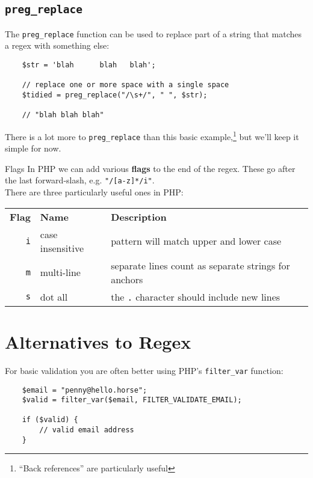 \subsection{\texttt{preg\_replace}}

The \texttt{preg\_replace} function can be used to replace part of a string that matches a regex with something else:

\begin{verbatim}
    $str = 'blah      blah   blah';

    // replace one or more space with a single space
    $tidied = preg_replace("/\s+/", " ", $str);

    // "blah blah blah"
\end{verbatim}


There is a lot more to \texttt{preg\_replace} than this basic example,\footnote{``Back references'' are particularly useful} but we'll keep it simple for now.

\begin{infobox}{Flags}
    In PHP we can add various \textbf{flags} to the end of the regex. These go after the last forward-slash, e.g. \texttt{"/[a-z]*/i"}.
    \\

    There are three particularly useful ones in PHP:

    \begin{tabu}{r l X}
        \textbf{Flag}    & \textbf{Name}    & \textbf{Description} \\
        \texttt{i}       & case insensitive & pattern will match upper and lower case \\
        \texttt{m}       & multi-line       & separate lines count as separate strings for anchors\\
        \texttt{s}       & dot all          & the \texttt{.} character should include new lines\\
    \end{tabu}
\end{infobox}


\section{Alternatives to Regex}

For basic validation you are often better using PHP's \texttt{filter\_var} function:

\begin{verbatim}
    $email = "penny@hello.horse";
    $valid = filter_var($email, FILTER_VALIDATE_EMAIL);

    if ($valid) {
        // valid email address
    }
\end{verbatim}

